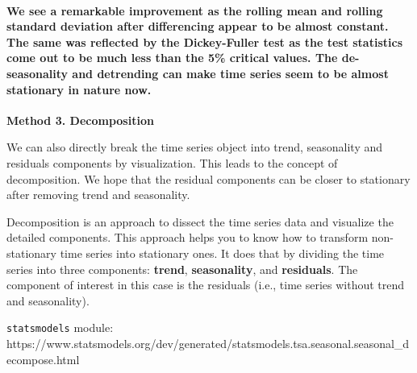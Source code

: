 \documentclass[11pt]{article}
\begin{document}
    \paragraph{We see a remarkable improvement as the rolling mean and
rolling standard deviation after differencing appear to be almost
constant. The same was reflected by the Dickey-Fuller test as the test
statistics come out to be much less than the 5\% critical values. The
de-seasonality and detrending can make time series seem to be almost
stationary in nature
now.}\label{we-see-a-remarkable-improvement-as-the-rolling-mean-and-rolling-standard-deviation-after-differencing-appear-to-be-almost-constant.-the-same-was-reflected-by-the-dickey-fuller-test-as-the-test-statistics-come-out-to-be-much-less-than-the-5-critical-values.-the-de-seasonality-and-detrending-can-make-time-series-seem-to-be-almost-stationary-in-nature-now.}

    \textbf{Method 3. Decomposition}

We can also directly break the time series object into trend,
seasonality and residuals components by visualization. This leads to the
concept of decomposition. We hope that the residual components can be
closer to stationary after removing trend and seasonality.

Decomposition is an approach to dissect the time series data and
visualize the detailed components. This approach helps you to know how
to transform non-stationary time series into stationary ones. It does
that by dividing the time series into three components: \textbf{trend},
\textbf{seasonality}, and \textbf{residuals}. The component of interest
in this case is the residuals (i.e., time series without trend and
seasonality).

\texttt{statsmodels} module:
https://www.statsmodels.org/dev/generated/statsmodels.tsa.seasonal.seasonal\_decompose.html
\end{document}
